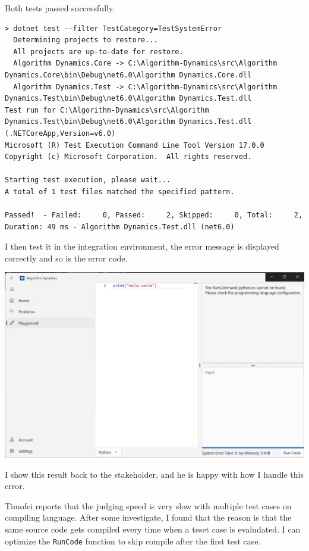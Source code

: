 \documentclass[a4paper]{report}
\newcommand{\code}{\texttt}
\begin{document}
Both tests passed successfully.

\begin{verbatim}
> dotnet test --filter TestCategory=TestSystemError
  Determining projects to restore...
  All projects are up-to-date for restore.
  Algorithm Dynamics.Core -> C:\Algorithm-Dynamics\src\Algorithm Dynamics.Core\bin\Debug\net6.0\Algorithm Dynamics.Core.dll
  Algorithm Dynamics.Test -> C:\Algorithm-Dynamics\src\Algorithm Dynamics.Test\bin\Debug\net6.0\Algorithm Dynamics.Test.dll
Test run for C:\Algorithm-Dynamics\src\Algorithm Dynamics.Test\bin\Debug\net6.0\Algorithm Dynamics.Test.dll (.NETCoreApp,Version=v6.0)
Microsoft (R) Test Execution Command Line Tool Version 17.0.0
Copyright (c) Microsoft Corporation.  All rights reserved.

Starting test execution, please wait...
A total of 1 test files matched the specified pattern.

Passed!  - Failed:     0, Passed:     2, Skipped:     0, Total:     2, Duration: 49 ms - Algorithm Dynamics.Test.dll (net6.0)
\end{verbatim}

I then test it in the integration environment, the error message is displayed correctly and so is the error code.

\includegraphics[width=\textwidth, height=\textheight, keepaspectratio]{SystemErrorReport}

I show this result back to the stakeholder, and he is happy with how I handle this error.

Timofei reports that the judging speed is very slow with multiple test cases on compiling language. After some investigate, I found that the reason is that the same source code gets compiled every time when a teset case is evaludated. I can optimize the \code{RunCode} function to skip compile after the first test case.
\end{document}
